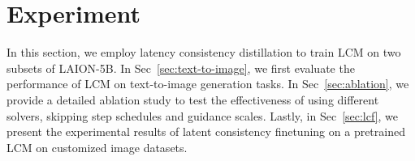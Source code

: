 \documentclass{article} %
\begin{document}









\vspace{-10pt}
\section{Experiment}
\vspace{-8pt}
In this section, we employ latency consistency distillation to train LCM on two subsets of LAION-5B.
In Sec~\ref{sec:text-to-image}, we first evaluate the performance of LCM on text-to-image generation tasks. In Sec~\ref{sec:ablation}, we provide a detailed ablation study to test the effectiveness of using different solvers, skipping step schedules and guidance scales. Lastly, in Sec~\ref{sec:lcf}, we present the experimental results of latent consistency finetuning on a pretrained LCM on customized image datasets.
\end{document}
